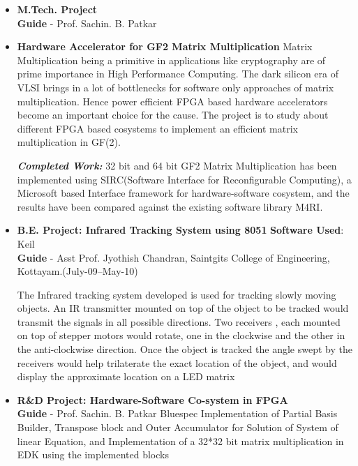 \documentclass[a4paper,10pt]{article}
\begin{document}
 \begin{itemize}

\setlength{\itemsep}{1pt}
   \item \textbf{{M.Tech. Project}}\\
        {\textbf{Guide} - Prof. Sachin. B. Patkar}

 \item \textbf{Hardware Accelerator for GF2 Matrix Multiplication }
	Matrix Multiplication being a primitive in applications like cryptography are of prime importance in High Performance Computing. 
	The dark silicon era of VLSI brings in a lot of bottlenecks for software only approaches of matrix multiplication. Hence power efficient
	FPGA based hardware accelerators become an important choice for the cause. The project is to study about different FPGA based cosystems to implement
	an efficient matrix multiplication in GF(2). 
	

 \textbf{\textit{Completed Work:}} 
   32 bit and 64 bit GF2 Matrix Multiplication has been implemented using SIRC(Software Interface for Reconfigurable Computing), a Microsoft based Interface framework
   for hardware-software cosystem, and the results have been compared against the existing software library M4RI. 





  \item \textbf{{B.E. Project: Infrared Tracking System using 8051}}  \qquad\qquad\qquad\qquad\qquad\quad \textbf{Software Used}: Keil\\
        {\textbf{Guide} - Asst Prof. Jyothish Chandran, Saintgits College of Engineering, Kottayam.\qquad\qquad\qquad\quad\qquad\qquad\qquad\quad\qquad\qquad\qquad\quad(July-09--May-10)} 
                                                         
	The Infrared tracking system developed is used for tracking slowly moving objects. An IR transmitter mounted on top of the 
	object to be tracked would transmit the signals in all possible directions. Two receivers , each mounted on top of stepper motors
	would rotate, one in the clockwise and the other in the anti-clockwise direction. Once the object is tracked the angle swept by
	the receivers would help trilaterate the exact location of the object, and would display the approximate location  on a LED matrix

  \item \textbf{{R\&D Project: Hardware-Software Co-system in FPGA}}\\
	{\textbf{Guide} - Prof. Sachin. B. Patkar \qquad\qquad\qquad\quad\qquad\qquad\qquad\quad\qquad\qquad\qquad\qquad\qquad\qquad\quad}
	Bluespec Implementation of Partial Basis Builder, Transpose block and Outer Accumulator for Solution of System of linear Equation,
	and Implementation of a 32*32 bit matrix multiplication in EDK using the implemented blocks
	

\end{itemize}
\end{document}

